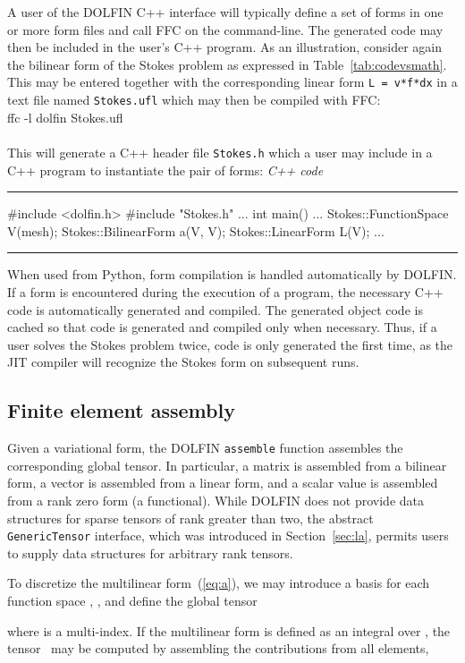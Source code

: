 \documentclass[acmtoms]{acmtrans2m}
\newenvironment{code}[1]{\center\tabular{c}\hline\\ \footnotesize\minipage{#1\textwidth}\verbatim}{\endverbatim\endminipage\\ \\ \hline\endtabular\endcenter}
\newenvironment{cppcode}[1]{\center\minipage{#1\textwidth}\footnotesize\hfill\it C++ code \rm\vspace{0.1cm}\hrule\renewcommand{\baselinestretch}{0.9}\footnotesize\verbatim}{\endverbatim\hrule\normalsize\endminipage\newline\endcenter}
\newcommand{\emp}[1]{\texttt{#1}}
\newcommand{\dolfin}{DOLFIN}
\begin{document}
A user of the \dolfin{} C++ interface will typically define a set of
forms in one or more form files and call FFC on the command-line. The
generated code may then be included in the user's C++ program. As an
illustration, consider again the bilinear form of the Stokes problem
as expressed in Table~\ref{tab:codevsmath}. This may be entered
together with the corresponding linear form \emp{L = v*f*dx} in a text
file named \emp{Stokes.ufl} which may then be compiled with FFC:
\begin{code}{0.9}
ffc -l dolfin Stokes.ufl
\end{code}
This will generate a C++ header file \emp{Stokes.h} which a user may
include in a C++ program to instantiate the pair of forms:
\begin{cppcode}{0.9}
#include <dolfin.h>
#include "Stokes.h"
...
int main()
{
  ...
  Stokes::FunctionSpace V(mesh);
  Stokes::BilinearForm a(V, V);
  Stokes::LinearForm L(V);
  ...
}
\end{cppcode}
When used from Python, form compilation is handled automatically by
\dolfin{}. If a form is encountered during the execution of a program,
the necessary C++ code is automatically generated and compiled. The
generated object code is cached so that code is generated and compiled
only when necessary. Thus, if a user solves the Stokes problem twice,
code is only generated the first time, as the JIT compiler will
recognize the Stokes form on subsequent runs.

\subsection{Finite element assembly}

Given a variational form, the \dolfin{} \emp{assemble} function
assembles the corresponding global tensor. In particular, a matrix is
assembled from a bilinear form, a vector is assembled from a linear
form, and a scalar value is assembled from a rank zero form (a
functional). While \dolfin{} does not provide data structures for
sparse tensors of rank greater than two, the abstract
\emp{GenericTensor} interface, which was
introduced in Section~\ref{sec:la},
permits users to supply data  structures for arbitrary rank tensors.

To discretize the multilinear form~(\ref{eq:a}), we may introduce a
basis  for each function space ,
, and define the global tensor

where  is a multi-index.  If the
multilinear form is defined as an integral over , the tensor~ may be computed by
assembling the contributions from all elements,
\end{document}
